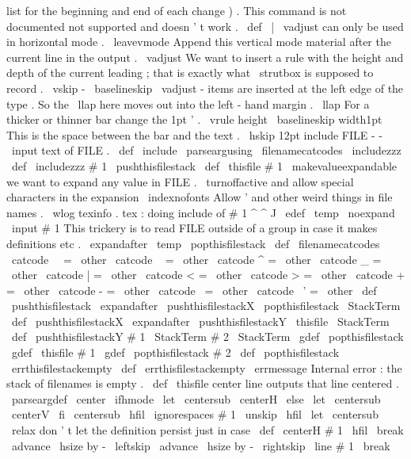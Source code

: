 {list
for
the
beginning
and
end
of
each
change
)
.
This
command
%
is
not
documented
not
supported
and
doesn
'
t
work
.
%
\
def
\
|
{
%
%
\
vadjust
can
only
be
used
in
horizontal
mode
.
\
leavevmode
%
%
Append
this
vertical
mode
material
after
the
current
line
in
the
output
.
\
vadjust
{
%
%
We
want
to
insert
a
rule
with
the
height
and
depth
of
the
current
%
leading
;
that
is
exactly
what
\
strutbox
is
supposed
to
record
.
\
vskip
-
\
baselineskip
%
%
\
vadjust
-
items
are
inserted
at
the
left
edge
of
the
type
.
So
%
the
\
llap
here
moves
out
into
the
left
-
hand
margin
.
\
llap
{
%
%
%
For
a
thicker
or
thinner
bar
change
the
1pt
'
.
\
vrule
height
\
baselineskip
width1pt
%
%
This
is
the
space
between
the
bar
and
the
text
.
\
hskip
12pt
}
%
}
%
}
%
include
FILE
-
-
\
input
text
of
FILE
.
%
\
def
\
include
{
\
parseargusing
\
filenamecatcodes
\
includezzz
}
\
def
\
includezzz
#
1
{
%
\
pushthisfilestack
\
def
\
thisfile
{
#
1
}
%
{
%
\
makevalueexpandable
%
we
want
to
expand
any
value
in
FILE
.
\
turnoffactive
%
and
allow
special
characters
in
the
expansion
\
indexnofonts
%
Allow
'
and
other
weird
things
in
file
names
.
\
wlog
{
texinfo
.
tex
:
doing
include
of
#
1
^
^
J
}
%
\
edef
\
temp
{
\
noexpand
\
input
#
1
}
%
%
%
This
trickery
is
to
read
FILE
outside
of
a
group
in
case
it
makes
%
definitions
etc
.
\
expandafter
}
\
temp
\
popthisfilestack
}
\
def
\
filenamecatcodes
{
%
\
catcode
\
\
=
\
other
\
catcode
~
=
\
other
\
catcode
^
=
\
other
\
catcode
_
=
\
other
\
catcode
|
=
\
other
\
catcode
<
=
\
other
\
catcode
>
=
\
other
\
catcode
+
=
\
other
\
catcode
-
=
\
other
\
catcode
\
=
\
other
\
catcode
\
'
=
\
other
}
\
def
\
pushthisfilestack
{
%
\
expandafter
\
pushthisfilestackX
\
popthisfilestack
\
StackTerm
}
\
def
\
pushthisfilestackX
{
%
\
expandafter
\
pushthisfilestackY
\
thisfile
\
StackTerm
}
\
def
\
pushthisfilestackY
#
1
\
StackTerm
#
2
\
StackTerm
{
%
\
gdef
\
popthisfilestack
{
\
gdef
\
thisfile
{
#
1
}
\
gdef
\
popthisfilestack
{
#
2
}
}
%
}
\
def
\
popthisfilestack
{
\
errthisfilestackempty
}
\
def
\
errthisfilestackempty
{
\
errmessage
{
Internal
error
:
the
stack
of
filenames
is
empty
.
}
}
%
\
def
\
thisfile
{
}
%
center
line
%
outputs
that
line
centered
.
%
\
parseargdef
\
center
{
%
\
ifhmode
\
let
\
centersub
\
centerH
\
else
\
let
\
centersub
\
centerV
\
fi
\
centersub
{
\
hfil
\
ignorespaces
#
1
\
unskip
\
hfil
}
%
\
let
\
centersub
\
relax
%
don
'
t
let
the
definition
persist
just
in
case
}
\
def
\
centerH
#
1
{
{
%
\
hfil
\
break
\
advance
\
hsize
by
-
\
leftskip
\
advance
\
hsize
by
-
\
rightskip
\
line
{
#
1
}
%
\
break
}
}
%
}
